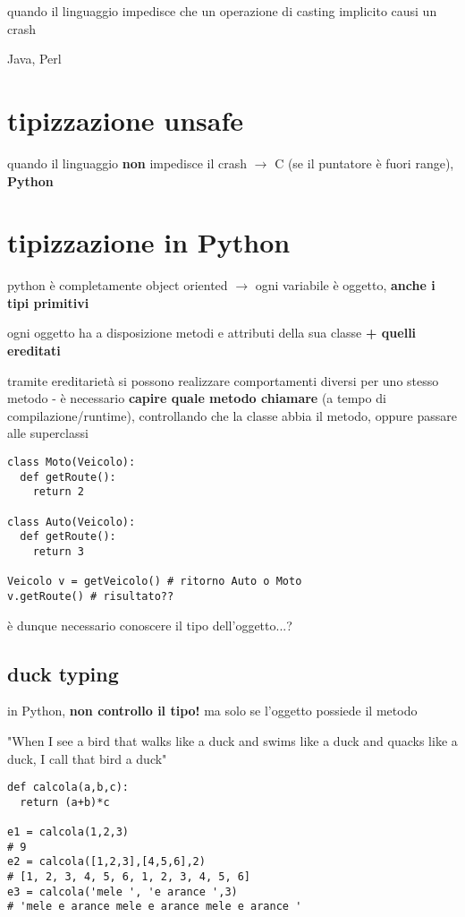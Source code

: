 quando il linguaggio impedisce che un operazione di casting implicito causi un crash

Java, Perl

\section{tipizzazione unsafe}

quando il linguaggio \textbf{non} impedisce il crash $\rightarrow$ C (se il puntatore \`e fuori range), \textbf{Python}

\section{tipizzazione in Python}

python \`e completamente object oriented $\rightarrow$ ogni variabile \`e oggetto, \textbf{anche i tipi primitivi}

ogni oggetto ha a disposizione metodi e attributi della sua classe \textbf{+ quelli ereditati}

tramite ereditariet\`a si possono realizzare comportamenti diversi per uno stesso metodo - \`e necessario \textbf{capire quale metodo chiamare} (a tempo di compilazione/runtime), controllando che la classe abbia il metodo, oppure passare alle superclassi

\begin{verbatim}
class Moto(Veicolo):
  def getRoute():
    return 2
  
class Auto(Veicolo):
  def getRoute():
    return 3
  
Veicolo v = getVeicolo() # ritorno Auto o Moto
v.getRoute() # risultato??
\end{verbatim}

\`e dunque necessario conoscere il tipo dell'oggetto...?

\subsection{duck typing}

in Python, \textbf{non controllo il tipo!} ma solo se l'oggetto possiede il metodo

\begin{displayquote}
 "When I see a bird that walks like a duck and swims like a duck and quacks like a duck, I call that bird a duck"
\end{displayquote}

\begin{verbatim}
def calcola(a,b,c):
  return (a+b)*c

e1 = calcola(1,2,3)
# 9
e2 = calcola([1,2,3],[4,5,6],2)
# [1, 2, 3, 4, 5, 6, 1, 2, 3, 4, 5, 6]
e3 = calcola('mele ', 'e arance ',3) 
# 'mele e arance mele e arance mele e arance '
\end{verbatim}

